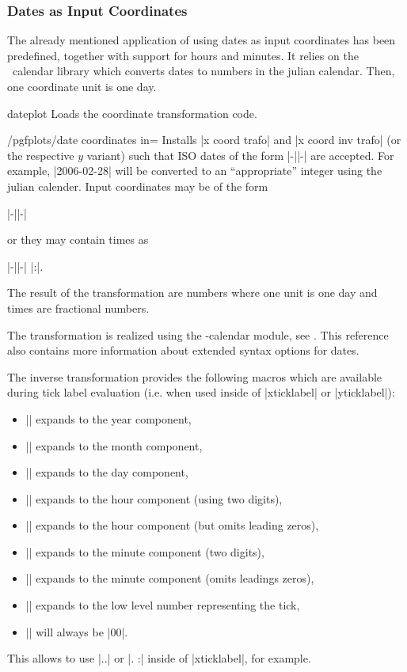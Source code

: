 \subsubsection{Dates as Input Coordinates}
\label{pgfplots:sec:date:coords}
The already mentioned application of using dates as input coordinates has been predefined, together with support for hours and minutes. It relies on the \pgfname\ calendar library which converts dates to numbers in the julian calendar. Then, one coordinate unit is one day.

\begin{pgfplotslibrary}{dateplot}
	Loads the coordinate transformation code.
\end{pgfplotslibrary}

\begin{stylekey}{/pgfplots/date coordinates in=}
	Installs |x coord trafo| and |x coord inv trafo| (or the respective $y$ variant) such that ISO dates of the form |-||-| are accepted. For example, |2006-02-28| will be converted to an ``appropriate'' integer using the julian calender. Input coordinates may be of the form
		
		|-||-|

	\noindent or they may contain times as

		|-||-| |:|.

	The result of the transformation are numbers where one unit is one day and times are fractional numbers.

	The transformation is realized using the \pgfname-calendar module, see \cite[Calendar Library]{tikz}. This reference also contains more information about extended syntax options for dates.

	The inverse transformation provides the following macros which are available during tick label evaluation (i.e. when used inside of |xticklabel| or |yticklabel|):
	\begin{itemize}
		\item |\year| expands to the year component,
		\item |\month| expands to the month component,
		\item |\day| expands to the day component,
		\item |\hour| expands to the hour component (using two digits),
		\item |\Hour| expands to the hour component (but omits leading zeros),
		\item |\minute| expands to the minute component (two digits),
		\item |\Minute| expands to the minute component (omits leadings zeros),
		\item |\lowlevel| expands to the low level number representing the tick,
		\item |\second| will always be |00|.
	\end{itemize}
	This allows to use |\day.\month.\year| or |\day. \hour:\minute| inside of |xticklabel|, for example.


\end{stylekey}
